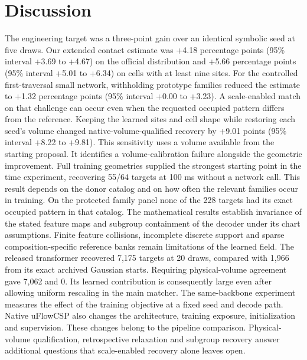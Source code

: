 \section{Discussion}

The engineering target was a three-point gain over an identical symbolic seed at five draws. Our extended contact estimate was +4.18 percentage points (95\% interval +3.69 to +4.67) on the official distribution and +5.66 percentage points (95\% interval +5.01 to +6.34) on cells with at least nine sites. For the controlled first-traversal small network, withholding prototype families reduced the estimate to +1.32 percentage points (95\% interval +0.00 to +3.23). A scale-enabled match on that challenge can occur even when the requested occupied pattern differs from the reference. Keeping the learned sites and cell shape while restoring each seed's volume changed native-volume-qualified recovery by +9.01 points (95\% interval +8.22 to +9.81). This sensitivity uses a volume available from the starting proposal. It identifies a volume-calibration failure alongside the geometric improvement. Full training geometries supplied the strongest starting point in the time experiment, recovering 55/64 targets at 100 ms without a network call. This result depends on the donor catalog and on how often the relevant families occur in training. On the protected family panel none of the 228 targets had its exact occupied pattern in that catalog. The mathematical results establish invariance of the stated feature maps and subgroup containment of the decoder under its chart assumptions. Finite feature collisions, incomplete discrete support and sparse composition-specific reference banks remain limitations of the learned field. The released transformer recovered 7,175 targets at 20 draws, compared with 1,966 from its exact archived Gaussian starts. Requiring physical-volume agreement gave 7,062 and 0. Its learned contribution is consequently large even after allowing uniform rescaling in the main matcher. The same-backbone experiment measures the effect of the training objective at a fixed seed and decode path. Native uFlowCSP also changes the architecture, training exposure, initialization and supervision. These changes belong to the pipeline comparison. Physical-volume qualification, retrospective relaxation and subgroup recovery answer additional questions that scale-enabled recovery alone leaves open.
